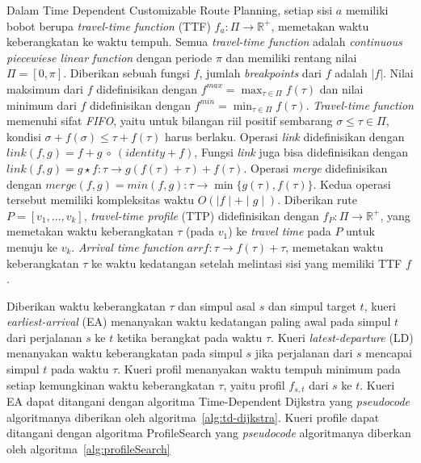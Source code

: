 Dalam Time Dependent Customizable Route Planning, setiap sisi $a$ memiliki bobot berupa \textit{travel-time function} (TTF) $f_a:\Pi\rightarrow \mathbb{R}^{+}$, memetakan waktu keberangkatan ke waktu tempuh. Semua \textit{travel-time function} adalah \textit{continuous piecewiese linear function} dengan periode $\pi$ dan memiliki rentang nilai $\Pi=[0,\pi]$. Diberikan sebuah fungsi $f$, jumlah \textit{breakpoints} dari $f$ adalah $|f| $. Nilai maksimum dari $f$ didefinisikan dengan $f^{max}=\max_{\tau\in\Pi}f(\tau)$ dan nilai minimum dari $f$ didefinisikan dengan $f^{min}=\min_{\tau\in\Pi}f(\tau)$. \textit{Travel-time function} memenuhi sifat \textit{FIFO}, yaitu untuk bilangan riil positif sembarang $\sigma\leq\tau\in\Pi$, kondisi $\sigma+f(\sigma)\leq \tau+f(\tau)$ harus berlaku. Operasi \textit{link} didefinisikan dengan $link(f,g)=f+g \ \circ \ (identity+f)$, Fungsi \textit{link} juga bisa didefinisikan dengan $link(f,g)=g \star f: \tau \rightarrow g(f(\tau)+\tau) + f(\tau)$. Operasi \textit{merge} didefinisikan dengan $merge(f,g)=min(f,g):\tau \rightarrow \min \{g(\tau), f(\tau) \}$. Kedua operasi tersebut memiliki kompleksitas waktu $O(\mid f\mid +\mid g\mid )$. Diberikan rute $P=[v_1,\ldots,v_k]$, \textit{travel-time profile} (TTP) didefinisikan dengan $f_P:\Pi\rightarrow \mathbb{R}^{+}$, yang memetakan waktu keberangkatan $\tau$ (pada $v_1$) ke \textit{travel time} pada $P$ untuk menuju ke $v_k$. \textit{Arrival time function} $arr f:\tau\rightarrow f(\tau)+\tau$, memetakan waktu keberangkatan $\tau$ ke waktu kedatangan setelah melintasi sisi yang memiliki TTF $f$. 

Diberikan waktu keberangkatan $\tau$ dan simpul asal $s$ dan simpul target $t$, kueri \textit{earliest-arrival} (EA) menanyakan waktu kedatangan paling awal pada simpul $t$ dari perjalanan $s$ ke $t$ ketika berangkat pada waktu $\tau$. Kueri \textit{latest-departure} (LD) menanyakan waktu keberangkatan pada simpul $s$ jika perjalanan dari $s$ mencapai simpul $t$ pada waktu $\tau$. Kueri profil menanyakan waktu tempuh minimum pada setiap kemungkinan waktu keberangkatan $\tau$, yaitu profil $f_{s,t}$ dari $s$ ke $t$. Kueri EA dapat ditangani dengan algoritma Time-Dependent Dijkstra yang \textit{pseudocode} algoritmanya diberikan oleh algoritma~\ref{alg:td-dijkstra}. Kueri profile dapat ditangani dengan algoritma ProfileSearch yang \textit{pseudocode} algoritmanya diberkan oleh algoritma~\ref{alg:profileSearch}

